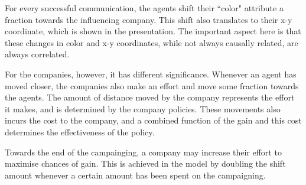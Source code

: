 For every successful communication, the agents shift their ``color" attribute a fraction towards the influencing company. This shift also translates to their x-y coordinate, which is shown in the presentation. The important aspect here is that these changes in color and x-y coordinates, while not always causally related, are always correlated. 

For the companies, however, it has different significance. Whenever an agent has moved closer, the companies also make an effort and move some fraction towards the agents. The amount of distance moved by the company represents the effort it makes, and is determined by the company policies. These movements also incurs the cost to the company, and a combined function of the gain and this cost determines the effectiveness of the policy.

Towards the end of the campainging, a company may increase their effort to maximise chances of gain. This is achieved in the model by doubling the shift amount whenever a certain amount has been spent on the campaigning.



